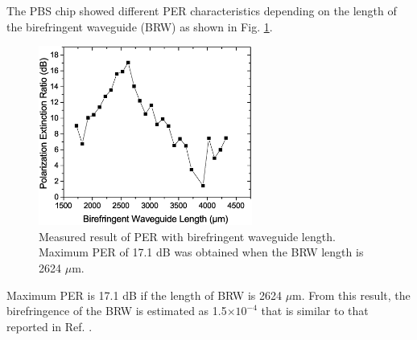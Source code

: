 \documentclass[letterpaper, 10pt]{article}
\begin{document}
The PBS chip showed different PER characteristics depending on the length of the birefringent waveguide (BRW) as shown in Fig. \ref{fig:BRW-PER}.
\begin{figure}
  \centering
  \includegraphics[width=7cm]{./BRWPER}
  \caption{Measured result of PER with birefringent waveguide length. Maximum PER of 17.1 dB was obtained when the BRW length is 2624 $\mu$m.}
  \label{fig:BRW-PER}
\end{figure}
Maximum PER is 17.1 dB  if the length of BRW is 2624 $\mu$m.
From this result, the birefringence of the BRW is estimated as 1.5$\times 10^{-4}$ that is similar to that reported in Ref. \cite{Hashizume:2015ta}.

\end{document}
